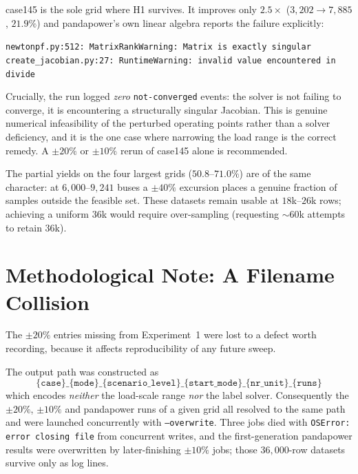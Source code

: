 \documentclass{article}
\begin{document}
case145 is the sole grid where H1 survives.  It improves only $2.5\times$
($3{,}202 \to 7{,}885$, $21.9\%$) and pandapower's own linear algebra reports
the failure explicitly:

\begin{center}
\texttt{newtonpf.py:512: MatrixRankWarning: Matrix is exactly singular}\\
\texttt{create\_jacobian.py:27: RuntimeWarning: invalid value encountered in divide}
\end{center}

Crucially, the run logged \emph{zero} \texttt{not-converged} events: the
solver is not failing to converge, it is encountering a structurally singular
Jacobian.  This is genuine numerical infeasibility of the perturbed operating
points rather than a solver deficiency, and it is the one case where
narrowing the load range is the correct remedy.  A $\pm20\%$ or $\pm10\%$
rerun of case145 alone is recommended.

The partial yields on the four largest grids ($50.8$--$71.0\%$) are of the
same character: at $6{,}000$--$9{,}241$ buses a $\pm40\%$ excursion places a
genuine fraction of samples outside the feasible set.  These datasets remain
usable at $18$k--$26$k rows; achieving a uniform $36$k would require
over-sampling (requesting ${\sim}60$k attempts to retain $36$k).


\section{Methodological Note: A Filename Collision}
\label{sec:collision}

The $\pm20\%$ entries missing from Experiment~1 were lost to a defect worth
recording, because it affects reproducibility of any future sweep.

The output path was constructed as
\[
\texttt{\{case\}\_\{mode\}\_\{scenario\_level\}\_\{start\_mode\}\_\{nr\_unit\}\_\{runs\}}
\]
which encodes \emph{neither} the load-scale range \emph{nor} the label
solver.  Consequently the $\pm20\%$, $\pm10\%$ and pandapower runs of a given
grid all resolved to the same path and were launched concurrently with
\texttt{--overwrite}.  Three jobs died with
\texttt{OSError: error closing file} from concurrent writes, and the
first-generation pandapower results were overwritten by later-finishing
$\pm10\%$ jobs; those $36{,}000$-row datasets survive only as log lines.
\end{document}
